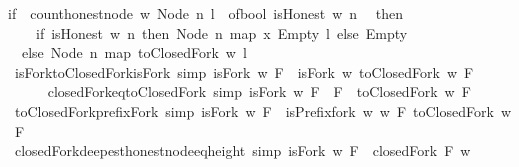 \begin{isabellebody}
{\isacharparenleft}if\ \ count{\isacharunderscore}honest{\isacharunderscore}node\ w\ {\isacharparenleft}Node\ n\ l{\isacharparenright}\ {\isacharequal}\ of{\isacharunderscore}bool\ {\isacharparenleft}isHonest\ w\ n{\isacharparenright}\isanewline
\ \ then\ \isanewline
\ \ \ \ {\isacharparenleft}if\ isHonest\ w\ n\ then\ Node\ n\ {\isacharparenleft}map\ {\isacharparenleft}{\isasymlambda}x{\isachardot}\ Empty{\isacharparenright}\ l{\isacharparenright}\ else\ Empty{\isacharparenright}\isanewline
\ \ else\ Node\ n\ {\isacharparenleft}map\ {\isacharparenleft}toClosedFork\ w{\isacharparenright}\ l{\isacharparenright}\isanewline
{\isacharparenright}{\isachardoublequoteclose}\isanewline
\isanewline
{}\isamarkupfalse%
\ isFork{\isacharunderscore}toClosedFork{\isacharunderscore}isFork\ {\isacharbrackleft}simp{\isacharbrackright}{\isacharcolon}\ {\isachardoublequoteopen}isFork\ w\ F\ {\isasymlongrightarrow}\ isFork\ w\ {\isacharparenleft}toClosedFork\ w\ F{\isacharparenright}{\isachardoublequoteclose}\isanewline
%
\isadelimproof
\ \ %
\endisadelimproof
%
\isatagproof
{}\isamarkupfalse%
%
\endisatagproof
{\isafoldproof}%
%
\isadelimproof
\isanewline
%
\endisadelimproof
\ \ \ \ \isanewline
{}\isamarkupfalse%
\ closedFork{\isacharunderscore}eq{\isacharunderscore}toClosedFork\ {\isacharbrackleft}simp{\isacharbrackright}{\isacharcolon}\ {\isachardoublequoteopen}isFork\ w\ F\ {\isasymlongrightarrow}\ F\ {\isacharequal}\ {\isacharparenleft}toClosedFork\ w\ F{\isacharparenright}{\isachardoublequoteclose}\isanewline
%
\isadelimproof
\ \ %
\endisadelimproof
%
\isatagproof
{}\isamarkupfalse%
%
\endisatagproof
{\isafoldproof}%
%
\isadelimproof
\ \isanewline
%
\endisadelimproof
\isanewline
{}\isamarkupfalse%
\ toClosedFork{\isacharunderscore}prefixFork\ {\isacharbrackleft}simp{\isacharbrackright}{\isacharcolon}\ {\isachardoublequoteopen}isFork\ w\ F\ {\isasymlongrightarrow}\ isPrefix{\isacharunderscore}fork\ w\ w\ F\ {\isacharparenleft}toClosedFork\ w\ F{\isacharparenright}{\isachardoublequoteclose}\isanewline
%
\isadelimproof
\ \ %
\endisadelimproof
%
\isatagproof
{}\isamarkupfalse%
%
\endisatagproof
{\isafoldproof}%
%
\isadelimproof
\isanewline
%
\endisadelimproof
\ \ \ \ \isanewline
{}\isamarkupfalse%
\ closedFork{\isacharunderscore}deepest{\isacharunderscore}honest{\isacharunderscore}node{\isacharunderscore}eq{\isacharunderscore}height\ {\isacharbrackleft}simp{\isacharbrackright}{\isacharcolon}\ {\isachardoublequoteopen}isFork\ w\ F\ {\isasymand}\ closedFork\ F\ w\ {\isasymlongrightarrow}\ \isanewline

\end{isabellebody}

